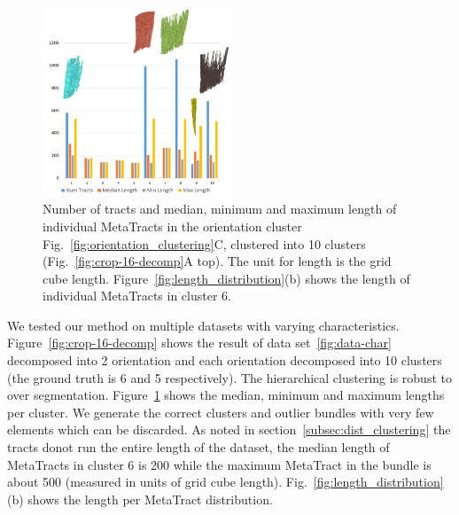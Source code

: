 \begin{figure}
\centering
	\includegraphics[width=0.5\textwidth]{imagesMT2014/Graph_crop16.PNG}
	\caption{Number of tracts and median, minimum and maximum length of individual MetaTracts in the orientation cluster Fig.~\ref{fig:orientation_clustering}C, clustered into 10 clusters (Fig.~\ref{fig:crop-16-decomp}A top). The unit for length is the grid cube length. Figure~\ref{fig:length_distribution}(b) shows the length of individual MetaTracts in cluster 6.}
	\label{fig:len_dist_crop16}
\end{figure}












We tested our method on multiple datasets with varying characteristics. 
Figure~\ref{fig:crop-16-decomp} shows the result of data set~\ref{fig:data-char} decomposed into 2 orientation and each orientation decomposed into 10 clusters (the ground truth is 6 and 5 respectively). The hierarchical clustering is robust to over segmentation.
Figure~\ref{fig:len_dist_crop16} shows the median, minimum and maximum lengths per cluster. We generate the correct clusters and outlier bundles with very few elements which can be discarded. As noted in section~\ref{subsec:dist_clustering} the tracts donot run the entire length of the dataset, the median length of MetaTracts in cluster 6 is 200 while the maximum MetaTract in the bundle is about 500 (measured in units of grid cube length). Fig.~\ref{fig:length_distribution}(b) shows the length per MetaTract distribution.

